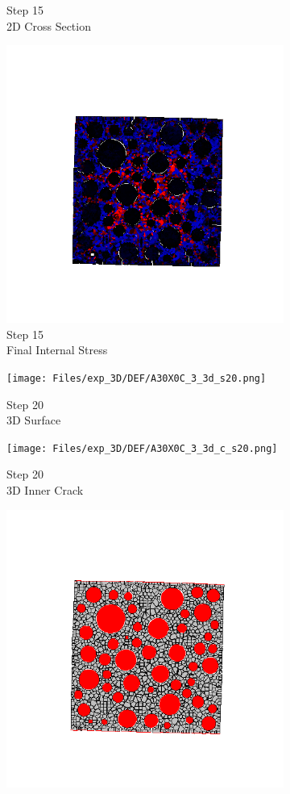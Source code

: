 \begin{figure}[ht!]
\begin{subfigure}{.25\textwidth}
      \caption{Step 15\\2D Cross Section}
    \end{subfigure}%
    \begin{subfigure}{.25\textwidth}
      \centering
      \includegraphics[width=.8\linewidth]{Files/exp_3D/DEF/A30X0C_3_s15.png}
      \caption{Step 15\\Final Internal Stress}
    \end{subfigure}
    \begin{subfigure}{.25\textwidth}
      \centering
      \texttt{[image: Files/exp\_3D/DEF/A30X0C\_3\_3d\_s20.png]}
      \caption{Step 20\\3D Surface}
    \end{subfigure}%
    \begin{subfigure}{.25\textwidth}
      \centering
      \texttt{[image: Files/exp\_3D/DEF/A30X0C\_3\_3d\_c\_s20.png]}
      \caption{Step 20\\3D Inner Crack}
    \end{subfigure}%
    \begin{subfigure}{.25\textwidth}
      \centering
      \includegraphics[width=.8\linewidth]{Files/exp_3D/DEF/A30X0C_3_crack.png}

\end{subfigure}
\end{figure}
